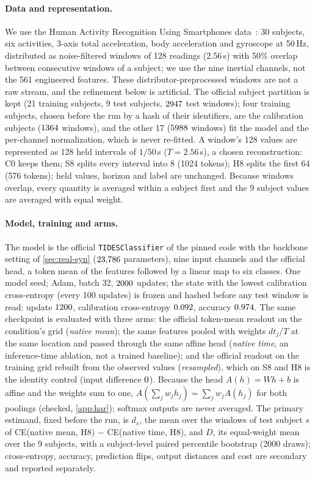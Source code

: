 \documentclass{article}
\theoremstyle{plain}
\theoremstyle{definition}
\theoremstyle{remark}
\begin{document}
\paragraph{Data and representation.}
We use the Human Activity Recognition Using Smartphones data~\citep{anguita2013har}: 30 subjects, six activities, 3-axis total acceleration, body acceleration and gyroscope at 50\,Hz, distributed as noise-filtered windows of 128 readings (2.56\,s) with 50\% overlap between consecutive windows of a subject; we use the nine inertial channels, not the 561 engineered features.
These distributor-preprocessed windows are not a raw stream, and the refinement below is artificial.
The official subject partition is kept (21 training subjects, 9 test subjects, $2947$ test windows); four training subjects, chosen before the run by a hash of their identifiers, are the calibration subjects ($1364$ windows), and the other 17 ($5988$ windows) fit the model and the per-channel normalization, which is never re-fitted.
A window's 128 values are represented as 128 held intervals of $1/50$\,s ($T{=}2.56$\,s), a chosen reconstruction: C0 keeps them; S8 splits every interval into 8 (1024 tokens); H8 splits the first 64 (576 tokens); held values, horizon and label are unchanged.
Because windows overlap, every quantity is averaged within a subject first and the 9 subject values are averaged with equal weight.

\paragraph{Model, training and arms.}
The model is the official \texttt{TIDESClassifier} of the pinned code with the backbone setting of \cref{sec:real-syn} ($23{,}786$ parameters), nine input channels and the official head, a token mean of the features followed by a linear map to six classes.
One model seed; Adam, batch 32, $2000$ updates; the state with the lowest calibration cross-entropy (every 100 updates) is frozen and hashed before any test window is read: update $1200$, calibration cross-entropy $0.092$, accuracy $0.974$.
The same checkpoint is evaluated with three arms: the official token-mean readout on the condition's grid (\emph{native mean}); the same features pooled with weights $dt_j/T$ at the same location and passed through the same affine head (\emph{native time}, an inference-time ablation, not a trained baseline); and the official readout on the training grid rebuilt from the observed values (\emph{resampled}), which on S8 and H8 is the identity control (input difference $0$).
Because the head $A(h)=Wh+b$ is affine and the weights sum to one, $A(\sum_jw_jh_j)=\sum_jw_jA(h_j)$ for both poolings (checked, \cref{app:har}); softmax outputs are never averaged.
The primary estimand, fixed before the run, is $d_s$, the mean over the windows of test subject $s$ of CE(native mean, H8) $-$ CE(native time, H8), and $D$, its equal-weight mean over the 9 subjects, with a subject-level paired percentile bootstrap (2000 draws); cross-entropy, accuracy, prediction flips, output distances and cost are secondary and reported separately.
\end{document}
